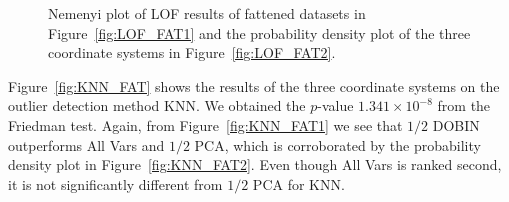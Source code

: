 \documentclass[11pt]{article}
\begin{document}
\begin{figure}[!h]
	\centering
	\caption{Nemenyi plot of LOF results of fattened datasets in Figure~\ref{fig:LOF_FAT1} and the probability density plot of the three coordinate systems in Figure~\ref{fig:LOF_FAT2}. }
	\label{fig:LOF_FAT}
\end{figure}


Figure~\ref{fig:KNN_FAT} shows the results of the three coordinate systems on the outlier detection method KNN. We obtained the $p$-value $1.341\times 10^{-8}$ from the Friedman test.  Again, from Figure~\ref{fig:KNN_FAT1} we see that $1/2$ DOBIN outperforms All Vars and $1/2$ PCA, which is corroborated by the probability density plot in Figure~\ref{fig:KNN_FAT2}. Even though All Vars is ranked second, it is not significantly different from $1/2$ PCA for KNN. \\
\end{document}
